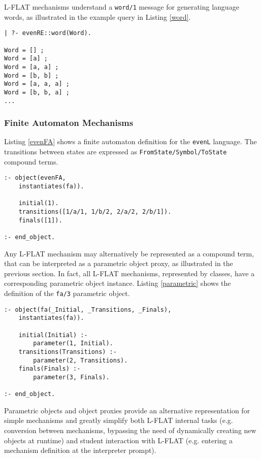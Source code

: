 \documentclass{llncs}
\begin{document}
L-FLAT mechanisms understand a \lstinline{word/1} message for generating language words, as illustrated in the example query in Listing \ref{word}.

\begin{lstlisting}[caption={Generating \lstinline{evenL} words using the \lstinline{evenRE} regular expression}, label=word]
| ?- evenRE::word(Word).

Word = [] ;
Word = [a] ;
Word = [a, a] ;
Word = [b, b] ;
Word = [a, a, a] ;
Word = [b, b, a] ;
...
\end{lstlisting}


\subsubsection{Finite Automaton Mechanisms}

Listing \ref{evenFA} shows a finite automaton definition for the \lstinline{evenL} language. The transitions between states are expressed as \lstinline{FromState/Symbol/ToState} compound terms.

\begin{lstlisting}[caption={Finite automaton for the \lstinline{evenL} language}, label=evenFA]
:- object(evenFA,
    instantiates(fa)).

    initial(1).
    transitions([1/a/1, 1/b/2, 2/a/2, 2/b/1]).
    finals([1]).

:- end_object.
\end{lstlisting}

\noindent
Any L-FLAT mechanism may alternatively be represented as a compound term, that can be interpreted as a parametric object proxy, as illustrated in the previous section. In fact, all L-FLAT mechanisms, represented by classes, have a corresponding parametric object instance. Listing \ref{parametric} shows the definition of the \lstinline{fa/3} parametric object.

\begin{lstlisting}[caption={Parametric object \lstinline{fa/3}}, label= parametric]
:- object(fa(_Initial, _Transitions, _Finals),
	instantiates(fa)).

	initial(Initial) :-
		parameter(1, Initial).
	transitions(Transitions) :-
		parameter(2, Transitions).
	finals(Finals) :-
		parameter(3, Finals).

:- end_object.
\end{lstlisting}

\noindent
Parametric objects and object proxies provide an alternative representation for simple mechanisms and greatly simplify both L-FLAT internal tasks (e.g. conversion between mechanisms, bypassing the need of dynamically creating new objects at runtime) and student interaction with L-FLAT (e.g. entering a mechanism definition at the interpreter prompt).
\end{document}
